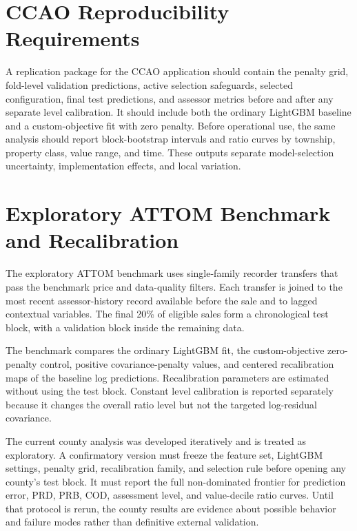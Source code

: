 \documentclass[10pt]{article}
\theoremstyle{definition}
\newcommand{\1}{\mathbf{1}}
\newcommand{\advisorchange}[1]{{\color{blue}#1}}
\begin{document}
{{\section{CCAO Reproducibility Requirements}
\label{app:ccao_results}

\advisorchange{A replication package for the CCAO application should contain} the penalty grid, fold-level validation predictions, active selection safeguards, selected configuration, final test predictions, and assessor metrics before and after any separate level calibration. It should include both the ordinary LightGBM baseline and a custom-objective fit with zero penalty. Before operational use, the same analysis should report block-bootstrap intervals and ratio curves by township, property class, value range, and time. These outputs separate model-selection uncertainty, implementation effects, and local variation.

\section{Exploratory ATTOM Benchmark and Recalibration}
\label{app:attom}

The exploratory ATTOM benchmark uses single-family recorder transfers \advisorchange{that pass the benchmark price and data-quality filters}. Each transfer is joined to the most recent assessor-history record available before the sale and to lagged contextual variables. The final 20\% of eligible sales form a chronological test block, with a validation block inside the remaining data.

The benchmark compares the ordinary LightGBM fit, the custom-objective zero-penalty control, positive covariance-penalty values, and centered recalibration maps of the baseline log predictions. Recalibration parameters are estimated without using the test block. Constant level calibration is reported separately because it changes the overall ratio level but not the targeted log-residual covariance.

The current county analysis was developed iteratively and is treated as exploratory. A confirmatory version must freeze the feature set, LightGBM settings, penalty grid, recalibration family, and selection rule before opening any county's test block. It must report the full non-dominated frontier for prediction error, PRD, PRB, COD, assessment level, and value-decile ratio curves. Until that protocol is rerun, the county results are evidence about possible behavior and failure modes rather than definitive external validation.

}}
\end{document}
